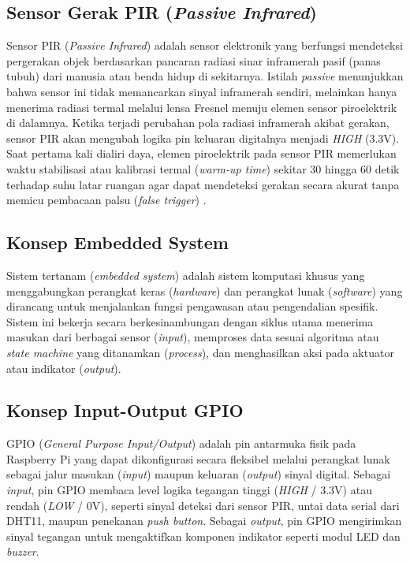 \documentclass[12pt, a4paper]{article}
\begin{document}
\subsection{Sensor Gerak PIR (\textit{Passive Infrared})}
Sensor PIR (\textit{Passive Infrared}) adalah sensor elektronik yang berfungsi mendeteksi pergerakan objek berdasarkan pancaran 
radiasi sinar inframerah pasif (panas tubuh) dari manusia atau benda hidup di sekitarnya. Istilah \textit{passive} menunjukkan 
bahwa sensor ini tidak memancarkan sinyal inframerah sendiri, melainkan hanya menerima radiasi termal melalui lensa Fresnel menuju 
elemen sensor piroelektrik di dalamnya. Ketika terjadi perubahan pola radiasi inframerah akibat gerakan, sensor PIR akan mengubah
 logika pin keluaran digitalnya menjadi \textit{HIGH} (3.3V). Saat pertama kali dialiri daya, elemen piroelektrik pada sensor PIR 
 memerlukan waktu stabilisasi atau kalibrasi termal (\textit{warm-up time}) sekitar 30 hingga 60 detik terhadap suhu latar ruangan
  agar dapat mendeteksi gerakan secara akurat tanpa memicu pembacaan palsu (\textit{false trigger}) \cite{adafruitpir}.

\subsection{Konsep Embedded System}
Sistem tertanam (\textit{embedded system}) adalah sistem komputasi khusus yang menggabungkan perangkat keras (\textit{hardware})
 dan perangkat lunak (\textit{software}) yang dirancang untuk menjalankan fungsi pengawasan atau pengendalian spesifik. 
 Sistem ini bekerja secara berkesinambungan dengan siklus utama menerima masukan dari berbagai sensor (\textit{input}), 
 memproses data sesuai algoritma atau \textit{state machine} yang ditanamkan (\textit{process}), dan menghasilkan aksi pada 
 aktuator atau indikator (\textit{output}).

\subsection{Konsep Input-Output GPIO}
GPIO (\textit{General Purpose Input/Output}) adalah pin antarmuka fisik pada Raspberry Pi yang dapat dikonfigurasi secara 
fleksibel melalui perangkat lunak sebagai jalur masukan (\textit{input}) maupun keluaran (\textit{output}) sinyal digital. 
Sebagai \textit{input}, pin GPIO membaca level logika tegangan tinggi (\textit{HIGH} / 3.3V) atau rendah (\textit{LOW} / 0V), 
seperti sinyal deteksi dari sensor PIR, untai data serial dari DHT11, maupun penekanan \textit{push button}. Sebagai
 \textit{output}, pin GPIO mengirimkan sinyal tegangan untuk mengaktifkan komponen indikator seperti modul LED dan \textit{buzzer}.
\end{document}
